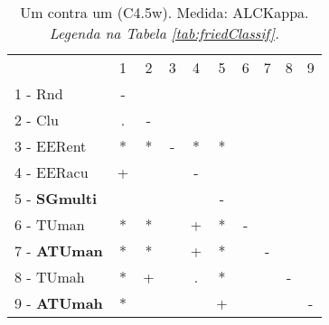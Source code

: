 \begin{table}[h]
\caption{Um contra um (C4.5w). Medida: ALCKappa. \textit{Legenda na Tabela \ref{tab:friedClassif}.}}
\begin{center}\begin{tabular}{lcc|cc|cc|cc|c}
 			& 1 & 2 & 3 & 4 & 5 & 6 & 7 & 8 & 9\\
1 - Rnd  	& - &   &   &   &   &   &   &   &   \\
2 - Clu  	& . & - &   &   &   &   &   &   &   \\ \hline
3 - EERent	& * & * & - & * & * &   &   &   &   \\
4 - EERacu	& + &   &   & - &   &   &   &   &   \\ \hline
5 - \textbf{SGmulti}	&   &   &   &   & - &   &   &   &   \\
6 - TUman	& * & * &   & + & * & - &   &   &   \\ \hline
7 - \textbf{ATUman}	& * & * &   & + & * &   & - &   &   \\
8 - TUmah	& * & + &   & . & * &   &   & - &   \\ \hline
9 - \textbf{ATUmah}	& * &   &   &   & + &   &   &   & - \\\end{tabular}
\label{stratsALCKappaFriedC4.5wRedux}
\end{center}
\end{table}
